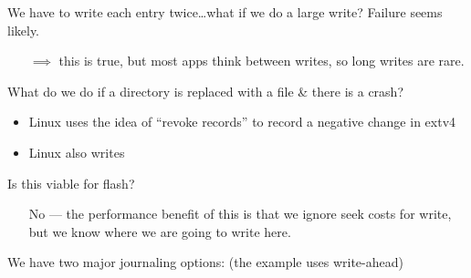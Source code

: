 \documentclass[../../lecture_notes.tex]{subfiles}
\begin{document}
We have to write each entry twice…what if we do a large write?  Failure seems likely.
\begin{enumerate} 
	\item[$\implies$] this is true, but most apps think between writes, so long writes are rare. 
\end{enumerate}

What do we do if a directory is replaced with a file \& there is a crash?
\begin{itemize}
	\item Linux uses the idea of “revoke records” to record a negative change in extv4
	\item Linux also writes
\end{itemize}


Is this viable for flash? 
\begin{enumerate} 
	\item[No]  — the performance benefit of this is that we ignore seek costs for write, but we know where we are going to write here.
\end{enumerate}
    

We have two major journaling options: (the example uses write-ahead)
\end{document}
